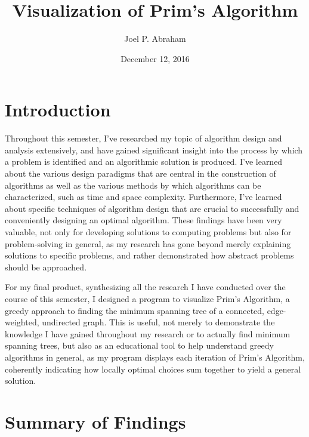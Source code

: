 \documentclass{article}
\title{Visualization of Prim's Algorithm}
\author{Joel P. Abraham }
\date{December 12, 2016}
\begin{document}
\maketitle

\section{Introduction}
Throughout this semester, I’ve researched my topic of algorithm design and analysis extensively, and have gained significant insight into the process by which a problem is identified and an algorithmic solution is produced. I’ve learned about the various design paradigms that are central in the construction of algorithms as well as the various methods by which algorithms can be characterized, such as time and space complexity. Furthermore, I’ve learned about specific techniques of algorithm design that are crucial to successfully and conveniently designing an optimal algorithm. These findings have been very valuable, not only for developing solutions to computing problems but also for problem-solving in general, as my research has gone beyond merely explaining solutions to specific problems, and rather demonstrated how abstract problems should be approached. 

For my final product, synthesizing all the research I have conducted over the course of this semester, I designed a program to visualize Prim’s Algorithm, a greedy approach to finding the minimum spanning tree of a connected, edge-weighted, undirected graph. This is useful, not merely to demonstrate the knowledge I have gained throughout my research or to actually find minimum spanning trees, but also as an educational tool to help understand greedy algorithms in general, as my program displays each iteration of Prim’s Algorithm, coherently indicating how locally optimal choices sum together to yield a general solution.

\section{Summary of Findings}
\end{document}
